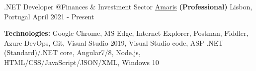 \begin{cventries}

\vspace{-0.25cm}

  \cventry
    {.NET Developer @Finances \& Investment Sector %
    } %
    {\href{https://www.amaris.com/}{Amaris} \textbf{(Professional)}} %
    {Lisbon, Portugal} %
    {April 2021 - Present} %
    {
      \begin{cvitems} %
		\item[] {\textbf{Technologies:} 
		\textcolor{rainbowcolor-olive}{Google Chrome}, 
		\textcolor{rainbowcolor-olive}{MS Edge}, 
		\textcolor{rainbowcolor-olive}{Internet Explorer},
		\textcolor{rainbowcolor-olive}{Postman},
		\textcolor{rainbowcolor-olive}{Fiddler}, 
		\textcolor{rainbowcolor-olive}{Azure DevOps}, 
		\textcolor{rainbowcolor-olive}{Git},    
		\textcolor{rainbowcolor-olive}{Visual Studio 2019}, 
		\textcolor{rainbowcolor-olive}{Visual Studio code}, 
		\textcolor{rainbowcolor-indigo}{ASP .NET (Standard)/.NET core}, 
		\textcolor{rainbowcolor-indigo}{Angular7/8}, 	
		\textcolor{rainbowcolor-indigo}{Node.js}, 
		\textcolor{rainbowcolor-indigo}{HTML/CSS/JavaScript/JSON/XML}, 		
		\textcolor{rainbowcolor-orange}{Windows 10}}			
      \end{cvitems}		
    }  
      

\end{cventries}
